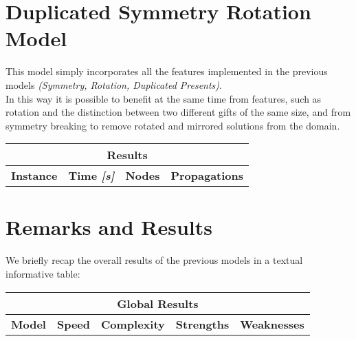 \section{Duplicated Symmetry Rotation Model}

This model simply incorporates all the features implemented in the previous models \textit{(Symmetry, Rotation, Duplicated Presents)}.
\\
In this way it is possible to benefit at the same time from features, such as rotation and the distinction between two different gifts of the same size, and from symmetry breaking to remove rotated and mirrored solutions from the domain.  


\begin{center}
    \begin{tabular}{|c|c|c|c|}
        \hline
        \multicolumn{4}{|c|}{\textbf{Results}} \\
        \hline
        \textbf{Instance} & \textbf{Time \textit{[s]}} & \textbf{Nodes} & \textbf{Propagations} \\
        \hline
    \end{tabular}
\end{center}

\section{Remarks and Results}
We briefly recap the overall results of the previous models in a textual informative table:

\begin{center}
    \begin{adjustwidth}{-1.5cm}{}
        \begin{tabular}{|c|c|c|c|c|}
            \hline
            \multicolumn{5}{|c|}{\textbf{Global Results}} \\
            \hline
            \textbf{Model} & \textbf{Speed} & \textbf{Complexity} & \textbf{Strengths} & \textbf{Weaknesses} \\
            \hline
        \end{tabular}
    \end{adjustwidth}
\end{center}